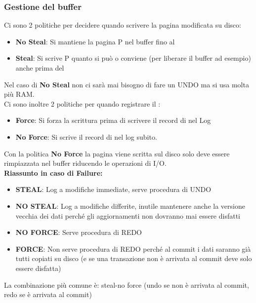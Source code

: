 \subsubsection{Gestione del buffer}
Ci sono 2 politiche per decidere quando scrivere la pagina modificata su disco:
\begin{itemize}
    \item \textbf{No Steal}: Si mantiene la pagina P nel buffer fino al 
    \item \textbf{Steal}: Si scrive P quanto si può o conviene (per liberare il buffer ad esempio) anche prima del 
\end{itemize}
Nel caso di \textbf{No Steal} non ci sarà mai bisogno di fare un UNDO ma si usa molta più RAM.\vspace{2mm} \\
Ci sono inoltre 2 politiche per quando registrare il :
\begin{itemize}
    \item \textbf{Force}: Si forza la scrittura prima di scrivere il record di  nel Log
    \item \textbf{No Force}: Si scrive il record di  nel log subito.
\end{itemize}
Con la politica \textbf{No Force} la pagina viene scritta sul disco solo deve essere rimpiazzata nel buffer riducendo le operazioni di I/O.\vspace{4mm} \\
\textbf{Riassunto in caso di Failure:}
\begin{itemize}
    \item \textbf{STEAL}: Log a modifiche immediate, serve procedura di UNDO
    
    \item \textbf{NO STEAL}: Log a modifiche differite, inutile mantenere anche la versione vecchia dei dati perché gli aggiornamenti non dovranno mai essere disfatti
    
    \item \textbf{NO FORCE}: Serve procedura di REDO
    
    \item \textbf{FORCE}: Non serve procedura di REDO perché al commit i dati saranno già tutti copiati su disco (e se una transazione non è arrivata al commit deve solo essere disfatta)
\end{itemize}
La combinazione più comune \`e: steal-no force (undo se non è arrivata al commit, redo se è arrivata al commit)


